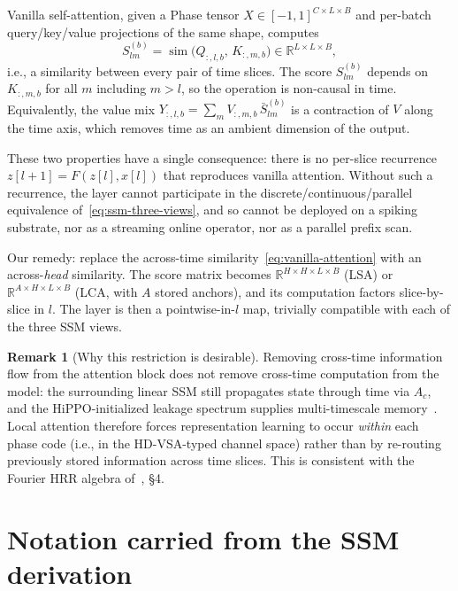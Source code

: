 \documentclass[11pt]{article}
\newcommand{\R}{\mathbb{R}}
\newcommand{\nh}{H}              %
\newcommand{\sm}{\operatorname{sim}}
\newcommand{\ie}{i.e.}
\theoremstyle{definition}
\newtheorem{remark}{Remark}
\begin{document}
Vanilla self-attention, given a Phase tensor
$X\in[-1,1]^{C\times L\times B}$ and per-batch query/key/value
projections of the same shape, computes
\begin{equation}\label{eq:vanilla-attention}
  S_{l m}^{(b)} = \sm\bigl(Q_{:,l,b},\, K_{:,m,b}\bigr)
       \in \R^{L\times L\times B},
\end{equation}
\ie, a similarity between every pair of time slices. The score
$S_{l m}^{(b)}$ depends on $K_{:,m,b}$ for all $m$ including $m > l$, so
the operation is non-causal in time. Equivalently, the value mix
\(
Y_{:,l,b} = \sum_m V_{:,m,b}\,\bar S_{lm}^{(b)}
\)
is a contraction of $V$ along the time axis, which removes time as an
ambient dimension of the output.

These two properties have a single consequence: there is no per-slice
recurrence $z[l+1] = F(z[l], x[l])$ that reproduces vanilla attention.
Without such a recurrence, the layer cannot participate in the
discrete/continuous/parallel equivalence
of~\eqref{eq:ssm-three-views}, and so cannot be deployed on a spiking
substrate, nor as a streaming online operator, nor as a parallel
prefix scan.

Our remedy: replace the across-time similarity~\eqref{eq:vanilla-attention}
with an across-\emph{head} similarity. The score matrix becomes
$\R^{\nh\times \nh\times L\times B}$ (LSA) or
$\R^{A\times \nh\times L\times B}$ (LCA, with $A$ stored anchors), and
its computation factors slice-by-slice in $l$. The layer is then a
pointwise-in-$l$ map, trivially compatible with each of the three SSM
views.

\begin{remark}[Why this restriction is desirable]
Removing cross-time information flow from the attention block does not
remove cross-time computation from the model: the surrounding linear
SSM still propagates state through time via $A_c$, and the
HiPPO-initialized leakage spectrum supplies multi-timescale
memory~\cite{hippo}. Local attention therefore forces representation
learning to occur \emph{within} each phase code (\ie, in the
HD-VSA-typed channel space) rather than by re-routing previously stored
information across time slices. This is consistent with the Fourier
HRR algebra of~\cite{phasor-ssm-derivation}, \S4.
\end{remark}

\section{Notation carried from the SSM derivation}\label{sec:notation}
\end{document}
